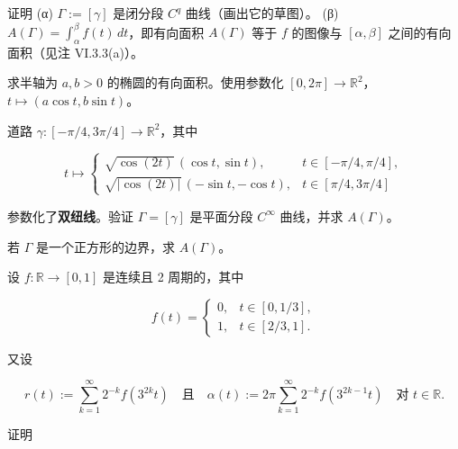 \begin{exercises}
\begin{items}
证明
(α) $ \Gamma := [\gamma] $ 是闭分段 $ C^{q} $ 曲线（画出它的草图）。
(β) $ A(\Gamma) = \int_{\alpha}^{\beta}f(t)\,dt $，即有向面积 $ A(\Gamma) $ 等于 $ f $ 的图像与 $ [\alpha, \beta] $ 之间的有向面积（见注 VI.3.3(a)）。

\item

求半轴为 $ a, b > 0 $ 的椭圆的有向面积。使用参数化 $ [0, 2\pi] \to \mathbb{R}^{2} $，$ t \mapsto (a\cos t, b\sin t) $。

\item

道路 $ \gamma : [-\pi/4, 3\pi/4] \to \mathbb{R}^{2} $，其中

\begin{equation*}
t \mapsto \begin{cases} \sqrt{\cos(2t)}\,(\cos t, \sin t) , & t \in [-\pi/4, \pi/4] , \\ \sqrt{\left|\cos(2t)\right|}\,(-\sin t, -\cos t) , & t \in [\pi/4, 3\pi/4] \end{cases}
\end{equation*}

参数化了\textbf{双纽线}。验证 $ \Gamma = [\gamma] $ 是平面分段 $ C^{\infty} $ 曲线，并求 $ A(\Gamma) $。


\end{items}

\item

若 $ \Gamma $ 是一个正方形的边界，求 $ A(\Gamma) $。

\item

设 $ f : \mathbb{R} \to [0, 1] $ 是连续且 2 周期的，其中

\begin{equation*}
f(t) = \begin{cases} 0 , & t \in [0, 1/3] , \\ 1 , & t \in [2/3, 1] . \end{cases}
\end{equation*}

又设

\[
r(t) := \sum_{k=1}^{\infty}2^{-k}f(3^{2k}t) \quad \text{且} \quad \alpha(t) := 2\pi\sum_{k=1}^{\infty}2^{-k}f(3^{2k-1}t) \quad \text{对 } t \in \mathbb{R} .
\]

证明

\begin{items}
\item


\end{items}
\end{exercises}
